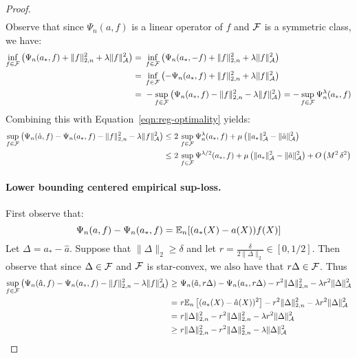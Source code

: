 \begin{proof}
\begin{align}
\end{align}
Observe that since $\Psi_n(a, f)$ is a linear operator of $f$ and ${\mathcal F}$ is a symmetric class, we have:
\begin{align}
    \inf_{f\in {\mathcal F}} \left(\Psi_n(a_*, f) + \|f\|_{2,n}^2 + \lambda \|f\|_{{\mathcal A}}^2\right) =~& \inf_{f\in {\mathcal F}} \left(\Psi_n(a_*, -f) + \|f\|_{2,n}^2 + \lambda \|f\|_{{\mathcal A}}^2\right)\\
    =~& \inf_{f\in {\mathcal F}} \left(- \Psi_n(a_*, f) + \|f\|_{2,n}^2 + \lambda \|f\|_{{\mathcal A}}^2\right)\\
    =~& - \sup_{f\in {\mathcal F}} \left(\Psi_n(a_*, f) - \|f\|_{2,n}^2 - \lambda \|f\|_{{\mathcal A}}^2\right) = -\sup_{f\in {\mathcal F}} \Psi_n^{\lambda}(a_*, f)
\end{align}
Combining this with Equation~\eqref{eqn:reg-optimality} yields:
\begin{align}
    \sup_{f \in {\mathcal F}} \left(\Psi_n(\hat{a}, f) - \Psi_n(a_*, f) - \|f\|_{2,n}^2 - \lambda \|f\|_{{\mathcal A}}^2\right) \leq~& 2\, \sup_{f\in {\mathcal F}} \Psi_n^{\lambda}(a_*, f) + \mu \left(\|a_*\|_{{\mathcal A}}^2 - \|\hat{a}\|_{{\mathcal A}}^2\right)\\
    \leq~& 2\,\sup_{f\in {\mathcal F}} \Psi^{\lambda/2}(a_*, f) + \mu \left(\|a_*\|_{{\mathcal A}}^2 - \|\hat{a}\|_{{\mathcal A}}^2\right) + O\left(M^2\, \delta^2\right)
\end{align}

\paragraph{Lower bounding centered empirical sup-loss.} First observe that:
\begin{equation}
    \Psi_n(a, f) - \Psi_n(a_*, f) = \mathbb{E}_n[(a_*(X)-a(X)) f(X)] 
\end{equation}
Let $\Delta=a_* - \hat{a}$. Suppose that $\|\Delta\|_2\geq \delta$ and let $r = \frac{\delta}{2\|\Delta\|_2}\in [0, 1/2]$. Then observe that since $\Delta\in {\mathcal F}$ and ${\mathcal F}$ is star-convex, we also have that $r \Delta\in {\mathcal F}$. Thus
\begin{align}
    \sup_{f \in {\mathcal F}} \left(\Psi_n(\hat{a}, f) - \Psi_n(a_*, f) - \|f\|_{2,n}^2 - \lambda \|f\|_{{\mathcal A}}^2\right) \geq~& 
    \Psi_n(\hat{a}, r\Delta) - \Psi_n(a_*, r\Delta) - r^2 \|\Delta\|_{2,n}^2 - \lambda r^2 \|\Delta\|_{{\mathcal A}}^2\\
    =~& r \mathbb{E}_n\left[(a_*(X) - \hat{a}(X))^2\right] - r^2 \|\Delta\|_{2,n}^2 - \lambda r^2 \|\Delta\|_{{\mathcal A}}^2\\
    =~& r \|\Delta\|_{2,n}^2 - r^2 \|\Delta\|_{2,n}^2 - \lambda r^2 \|\Delta\|_{{\mathcal A}}^2\\
    \geq~& r \|\Delta\|_{2,n}^2 - r^2 \|\Delta\|_{2,n}^2 - \lambda \|\Delta\|_{{\mathcal A}}^2
\end{align}


\end{proof}
